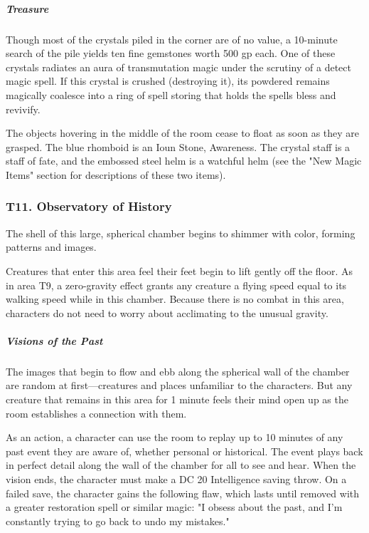 \documentclass[10pt,a4paper,twoside,bg=print,twocolumn,openany,nodeprecatedcode]{dndbook}
\begin{document}
\subparagraph{Treasure}
Though most of the crystals piled in the corner are of no value, a 10-minute search of the pile yields ten fine gemstones worth 500 gp each. One of these crystals radiates an aura of transmutation magic under the scrutiny of a detect magic spell. If this crystal is crushed (destroying it), its powdered remains magically coalesce into a ring of spell storing that holds the spells bless and revivify.

The objects hovering in the middle of the room cease to float as soon as they are grasped. The blue rhomboid is an Ioun Stone, Awareness. The crystal staff is a staff of fate, and the embossed steel helm is a watchful helm (see the "New Magic Items" section for descriptions of these two items).

\subsubsection{T11. Observatory of History}
\begin{DndReadAloud}{}
The shell of this large, spherical chamber begins to shimmer with color, forming patterns and images.

\end{DndReadAloud}

Creatures that enter this area feel their feet begin to lift gently off the floor. As in area T9, a zero-gravity effect grants any creature a flying speed equal to its walking speed while in this chamber. Because there is no combat in this area, characters do not need to worry about acclimating to the unusual gravity.

\subparagraph{Visions of the Past}
The images that begin to flow and ebb along the spherical wall of the chamber are random at first—creatures and places unfamiliar to the characters. But any creature that remains in this area for 1 minute feels their mind open up as the room establishes a connection with them.

As an action, a character can use the room to replay up to 10 minutes of any past event they are aware of, whether personal or historical. The event plays back in perfect detail along the wall of the chamber for all to see and hear. When the vision ends, the character must make a DC 20 Intelligence saving throw. On a failed save, the character gains the following flaw, which lasts until removed with a greater restoration spell or similar magic: "I obsess about the past, and I'm constantly trying to go back to undo my mistakes."
\end{document}
